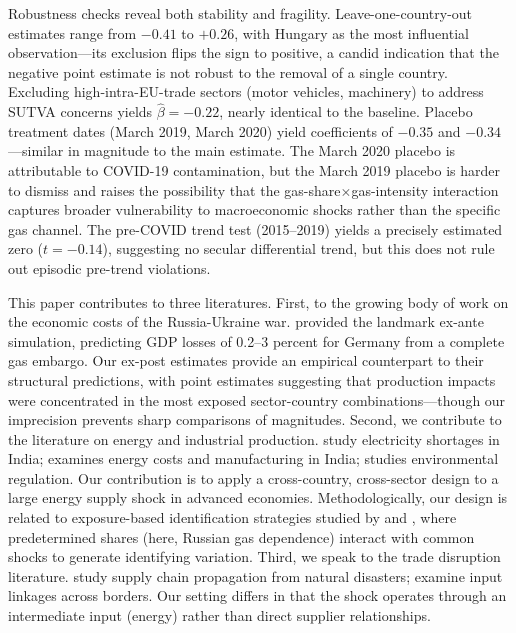 \documentclass[12pt]{article}
\begin{document}
Robustness checks reveal both stability and fragility. Leave-one-country-out estimates range from $-0.41$ to $+0.26$, with Hungary as the most influential observation---its exclusion flips the sign to positive, a candid indication that the negative point estimate is not robust to the removal of a single country. Excluding high-intra-EU-trade sectors (motor vehicles, machinery) to address SUTVA concerns yields $\hat{\beta} = -0.22$, nearly identical to the baseline. Placebo treatment dates (March 2019, March 2020) yield coefficients of $-0.35$ and $-0.34$---similar in magnitude to the main estimate. The March 2020 placebo is attributable to COVID-19 contamination, but the March 2019 placebo is harder to dismiss and raises the possibility that the gas-share$\times$gas-intensity interaction captures broader vulnerability to macroeconomic shocks rather than the specific gas channel. The pre-COVID trend test (2015--2019) yields a precisely estimated zero ($t = -0.14$), suggesting no secular differential trend, but this does not rule out episodic pre-trend violations.

This paper contributes to three literatures. First, to the growing body of work on the economic costs of the Russia-Ukraine war. \citet{bachmann2022} provided the landmark ex-ante simulation, predicting GDP losses of 0.2--3 percent for Germany from a complete gas embargo. Our ex-post estimates provide an empirical counterpart to their structural predictions, with point estimates suggesting that production impacts were concentrated in the most exposed sector-country combinations---though our imprecision prevents sharp comparisons of magnitudes. Second, we contribute to the literature on energy and industrial production. \citet{allcott2016} study electricity shortages in India; \citet{abeberese2017} examines energy costs and manufacturing in India; \citet{costa2021} studies environmental regulation. Our contribution is to apply a cross-country, cross-sector design to a large energy supply shock in advanced economies. Methodologically, our design is related to exposure-based identification strategies studied by \citet{goldsmith2020} and \citet{borusyak2022}, where predetermined shares (here, Russian gas dependence) interact with common shocks to generate identifying variation. Third, we speak to the trade disruption literature. \citet{barrot2016} study supply chain propagation from natural disasters; \citet{boehm2019} examine input linkages across borders. Our setting differs in that the shock operates through an intermediate input (energy) rather than direct supplier relationships.
\end{document}
